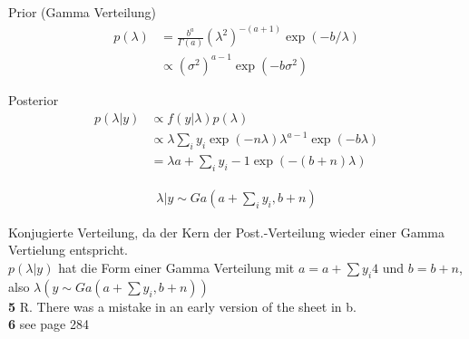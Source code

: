 \documentclass{article}
\begin{document}
Prior (Gamma Verteilung)
\begin{align*}
p(\lambda)  &= \frac{b^a}{\Gamma(a)} (\lambda^2)^{-(a+1)} \exp(-b/\lambda)  \\
&\propto  (\sigma^2)^{a-1} \exp(-b\sigma^2)  
\end{align*}

Posterior
\begin{align*}
p(\lambda | y) &\propto f(y|\lambda) p(\lambda)  \\
&\propto \lambda{\sum_i y_i} \exp(-n \lambda) \lambda^{a-1} \exp(-b \lambda) \\
&= \lambda{ a + \sum_i y_i -1 } \exp(-(b+n)\lambda)
\end{align*}

\begin{align*}
\lambda | y \sim Ga(a + \sum_i y_i, b+n)
\end{align*}

Konjugierte Verteilung, da der Kern der Post.-Verteilung wieder einer Gamma Vertielung entspricht.\\
$p(\lambda | y)$ hat die Form einer Gamma Verteilung mit $a=a+\sum y_i4$ und $b=b+n$, also $\lambda(y  \sim Ga(a+\sum y_i, b+n) )$\\

\textbf{5} R. There was a mistake in an early version of the sheet in b.\\
\newpage
\textbf{6} see page 284\\
\end{document}
